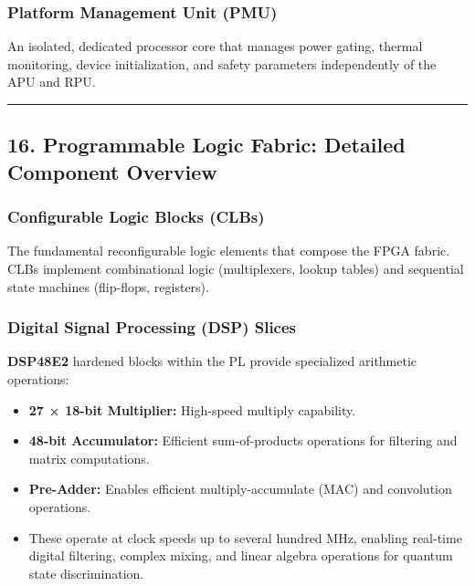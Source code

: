 \documentclass[
]{article}
\providecommand{\tightlist}{%
  \setlength{\itemsep}{0pt}\setlength{\parskip}{0pt}}
\begin{document}
\subsubsection{Platform Management Unit
(PMU)}\label{platform-management-unit-pmu-1}

An isolated, dedicated processor core that manages power gating, thermal
monitoring, device initialization, and safety parameters independently
of the APU and RPU.

\begin{center}\rule{0.5\linewidth}{0.5pt}\end{center}

\subsection{16. Programmable Logic Fabric: Detailed Component
Overview}\label{programmable-logic-fabric-detailed-component-overview}

\subsubsection{Configurable Logic Blocks
(CLBs)}\label{configurable-logic-blocks-clbs}

The fundamental reconfigurable logic elements that compose the FPGA
fabric. CLBs implement combinational logic (multiplexers, lookup tables)
and sequential state machines (flip-flops, registers).

\subsubsection{Digital Signal Processing (DSP)
Slices}\label{digital-signal-processing-dsp-slices}

\textbf{DSP48E2} hardened blocks within the PL provide specialized
arithmetic operations:

\begin{itemize}
\tightlist
\item
  \textbf{27 × 18-bit Multiplier:} High-speed multiply capability.
\item
  \textbf{48-bit Accumulator:} Efficient sum-of-products operations for
  filtering and matrix computations.
\item
  \textbf{Pre-Adder:} Enables efficient multiply-accumulate (MAC) and
  convolution operations.
\item
  These operate at clock speeds up to several hundred MHz, enabling
  real-time digital filtering, complex mixing, and linear algebra
  operations for quantum state discrimination.
\end{itemize}
\end{document}
